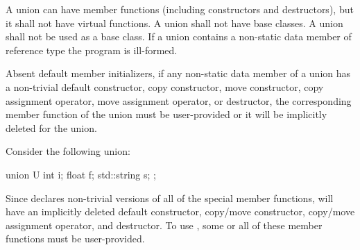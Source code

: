 \pnum
{}%
%
%
A union can have member functions (including constructors and destructors),
%
but it shall not have virtual functions. A union shall not have
base classes. A union shall not be used as a base class.
%
If a union contains a non-static data member of
reference type the program is ill-formed.
\begin{note} Absent default member initializers,
if any non-static data member of a union has a non-trivial
default constructor,
copy constructor,
move constructor,
copy assignment operator,
move assignment operator,
or destructor, the corresponding member function
of the union must be user-provided or it will
be implicitly deleted for the union. \end{note}

\pnum
\begin{example} Consider the following union:

\begin{codeblock}
union U {
  int i;
  float f;
  std::string s;
};
\end{codeblock}

Since  declares non-trivial versions of all of the special
member functions,  will have an implicitly deleted default constructor,
copy/move constructor,
copy/move assignment operator, and destructor.
To use , some or all of these member functions
must be user-provided.\end{example}

